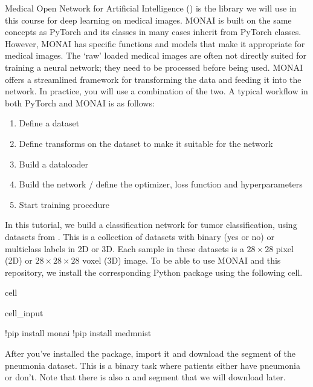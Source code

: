 \documentclass[letterpaper,10pt,english]{jupyterBook}
\begin{document}
\sphinxAtStartPar
Medical Open Network for Artificial Intelligence () is the library we will use in this course for deep learning on medical images. MONAI is built on the same concepts as PyTorch and its classes in many cases inherit from PyTorch classes. However, MONAI has specific functions and models that make it appropriate for medical images. The ‘raw’ loaded medical images are often not directly suited for training a neural network; they need to be processed before being used. MONAI offers a streamlined framework for transforming the data and feeding it into the network. In practice, you will use a combination of the two. A typical workflow in both PyTorch and MONAI is as follows:
\begin{enumerate}
%
\item {} 
\sphinxAtStartPar
Define a dataset

\item {} 
\sphinxAtStartPar
Define transforms on the dataset to make it suitable for the network

\item {} 
\sphinxAtStartPar
Build a dataloader

\item {} 
\sphinxAtStartPar
Build the network / define the optimizer, loss function and hyperparameters

\item {} 
\sphinxAtStartPar
Start training procedure

\end{enumerate}

\sphinxAtStartPar
In this tutorial, we build a classification network for tumor classification, using datasets from . This is a collection of datasets with binary (yes or no) or multiclass labels in 2D or 3D. Each sample in these datasets is a \(28\times 28\) pixel (2D) or \(28\times 28\times 28\) voxel (3D) image. To be able to use MONAI and this repository, we install the corresponding Python package using the following cell.

\begin{sphinxuseclass}{cell}\begin{sphinxVerbatimInput}

\begin{sphinxuseclass}{cell_input}
\begin{sphinxVerbatim}[commandchars=\\\{\}]
!pip install monai
!pip install medmnist
\end{sphinxVerbatim}

\end{sphinxuseclass}\end{sphinxVerbatimInput}

\end{sphinxuseclass}
\sphinxAtStartPar
After you’ve installed the  package, import it and download the  segment of the pneumonia dataset. This is a binary task where patients either have pneumonia or don’t. Note that there is also a  and  segment that we will download later.
\end{document}
